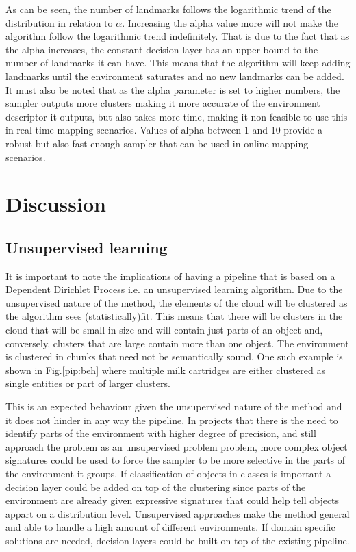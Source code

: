 \documentclass[twoside,hidelinks]{article}
\begin{document}
As can be seen, the number of landmarks follows the logarithmic trend of the distribution in relation to $\alpha$. Increasing the alpha value more will not make the algorithm follow the logarithmic trend indefinitely. That is due to the fact that as the alpha increases, the constant decision layer has an upper bound to the number of landmarks it can have. This means that the algorithm will keep adding landmarks until the environment saturates and no new landmarks can be added. It must also be noted that as the alpha parameter is set to higher numbers, the sampler outputs more clusters making it more accurate of the environment descriptor it outputs, but also takes more time, making it non feasible to use this in real time mapping scenarios. Values of alpha between 1 and 10 provide a robust but also fast enough sampler that can be used in online mapping scenarios.



\newpage
\section{Discussion}
\label{sec:discussion}

    
\subsection{Unsupervised learning}


It is important to note the implications of having a pipeline that is based on a Dependent Dirichlet Process i.e. an unsupervised learning algorithm. Due to the unsupervised nature of the method, the elements of the cloud will be clustered as the algorithm sees (statistically)fit. This means that there will be clusters in the cloud that will be small in size and will contain just parts of an object and, conversely, clusters that are large contain more than one object. The environment is clustered in chunks that need not be semantically sound. One such example is shown in Fig.\ref{pip:beh} where multiple milk cartridges are either clustered as single entities or part of larger clusters.

This is an expected behaviour given the unsupervised nature of the method and it does not hinder in any way the  pipeline. In projects that there is the need to identify parts of the environment with higher degree of precision, and still approach the problem as an unsupervised problem problem, more complex object signatures could be used to force the sampler to be more selective in the parts of the environment it groups. If classification of objects in classes is important a decision layer could be added on top of the clustering since parts of the environment are already given expressive signatures that could help tell objects appart on a distribution level. Unsupervised approaches make the method general and able to handle a high amount of different environments. If domain specific solutions are needed, decision layers could be built on top of the existing pipeline.
\end{document}
